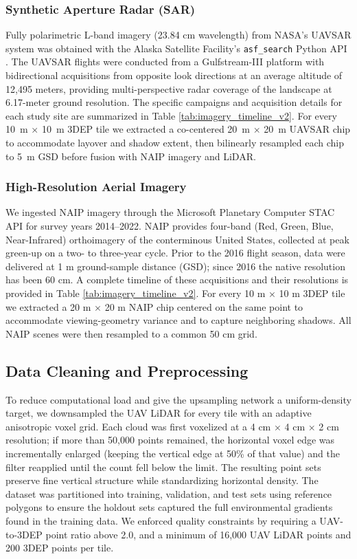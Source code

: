 \documentclass[remotesensing,article,submit,pdftex,moreauthors]{Definitions/mdpi}
\begin{document}
\subsubsection{Synthetic Aperture Radar (SAR)}
Fully polarimetric L-band imagery (23.84 cm wavelength) from NASA’s UAVSAR system was obtained with the Alaska Satellite Facility’s \texttt{asf\_search} Python API \citep{alaska_search}.  The UAVSAR flights were conducted from a Gulfstream-III platform with bidirectional acquisitions from opposite look directions at an average altitude of 12,495 meters, providing multi-perspective radar coverage of the landscape at 6.17-meter ground resolution. The specific campaigns and acquisition details for each study site are summarized in Table \ref{tab:imagery_timeline_v2}. For every \SI{10}{m} × \SI{10}{m} 3DEP tile we extracted a co-centered \SI{20}{m} × \SI{20}{m} UAVSAR chip to accommodate layover and shadow extent, then bilinearly resampled each chip to \SI{5}{m} GSD before fusion with NAIP imagery and LiDAR. 


\subsubsection{High-Resolution Aerial Imagery}
We ingested NAIP imagery through the Microsoft Planetary Computer STAC API \citep{planetary_computer} for survey years 2014–2022.  
NAIP provides four-band (Red, Green, Blue, Near-Infrared) orthoimagery of the conterminous United States, collected at peak green-up on a two- to three-year cycle.  Prior to the 2016 flight season, data were delivered at 1 m ground-sample distance (GSD); since 2016 the native resolution has been 60 cm. A complete timeline of these acquisitions and their resolutions is provided in Table \ref{tab:imagery_timeline_v2}. For every 10 m × 10 m 3DEP tile we extracted a 20 m × 20 m NAIP chip centered on the same point to accommodate viewing-geometry variance and to capture neighboring shadows.  All NAIP scenes were then resampled to a common 50 cm grid.



\subsection{Data Cleaning and Preprocessing}
To reduce computational load and give the upsampling network a uniform-density target, we downsampled the UAV LiDAR for every tile with an adaptive anisotropic voxel grid. Each cloud was first voxelized at a 4 cm × 4 cm × 2 cm resolution; if more than 50,000 points remained, the horizontal voxel edge was incrementally enlarged (keeping the vertical edge at 50\% of that value) and the filter reapplied until the count fell below the limit. The resulting point sets preserve fine vertical structure while standardizing horizontal density. The dataset was partitioned into training, validation, and test sets using reference polygons to ensure the holdout sets captured the full environmental gradients found in the training data. We enforced quality constraints by requiring a UAV-to-3DEP point ratio above 2.0, and a minimum of 16,000 UAV LiDAR points and 200 3DEP points per tile.
\end{document}
